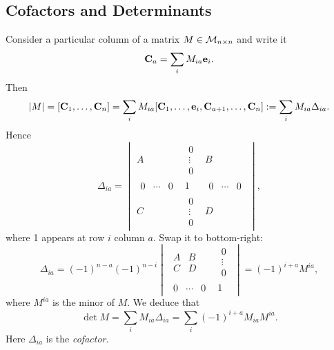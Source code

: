 \documentclass[10pt]{article}
\begin{document}
    \subsection{Cofactors and Determinants}
    Consider a particular column of a matrix $ M\in {\mathcal{M}}_{n\times n} $ and write it 
    \[
        {\bf C}_a=\sum_{i}M_{ia}{\bf e}_i
    .\]
    Then 
    \[
        |M|=[{\bf C}_1,\dots,{\bf C}_n]=\sum_{i}M_{ia}[{\bf C}_1,\dots,{\bf e}_i,{\bf C}_{a+1},\dots,{\bf C}_n]:= \sum_i M_{ia}\Delta_{ia}
    .\]
    Hence
    \[
        \Delta_{ia}=\begin{vmatrix}
            A & \begin{matrix}
                0\\ \vdots \\ 0
            \end{matrix} & B\\
            \begin{matrix}
                0 & \cdots & 0
            \end{matrix} & 1 &\begin{matrix}
                0 & \cdots & 0
            \end{matrix}\\
            C & \begin{matrix}
                0\\ \vdots \\ 0
            \end{matrix} & D
        \end{vmatrix}
    ,\]
    where 1 appears at row $i$ column $a$. Swap it to bottom-right:
    \[
        \Delta_{ia}=(-1)^{n-a}(-1)^{n-i}\begin{vmatrix}
            \begin{matrix}
                A&B\\C&D
            \end{matrix}&\begin{matrix}
                0\\ \vdots \\ 0
            \end{matrix}\\
            \begin{matrix}
                0 & \cdots & 0
            \end{matrix}&1
        \end{vmatrix}=(-1)^{i+a}M^{ia}
    ,\]
    where $ M^{ia} $ is the minor of $M$. We deduce that 
    \[
        \det M = \sum_{i} M_{ia}\Delta_{ia}=\sum_{i}(-1)^{i+a}M_{ia}M^{ia}
    .\]
    Here $\Delta_{ia}$ is the \textit{cofactor}.
\end{document}

